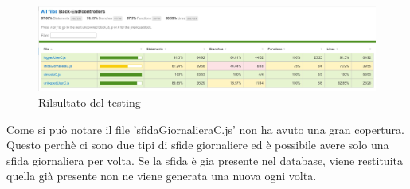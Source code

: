 \begin{figure}[!h]
\centering
\includegraphics[scale=0.22]{images/test_result.jpg}
\caption{Rilsultato del testing}
\label{fig:test_result}
\end{figure}
\noindent
Come si può notare il file 'sfidaGiornalieraC.js' non ha avuto una gran copertura. Questo perchè ci sono due tipi di sfide giornaliere ed è possibile avere solo una sfida giornaliera per volta. Se la sfida è gia presente nel database, viene restituita quella già presente non ne viene generata una nuova ogni volta.